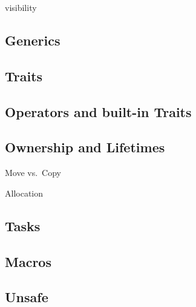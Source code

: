 \documentclass[]{article}
\begin{document}
visibility

\subsection{Generics}\label{generics}

\subsection{Traits}\label{traits}

\subsection{Operators and built-in
Traits}\label{operators-and-built-in-traits}

\subsection{Ownership and Lifetimes}\label{ownership-and-lifetimes}

Move vs.~Copy

Allocation

\subsection{Tasks}\label{tasks}

\subsection{Macros}\label{macros}

\subsection{Unsafe}\label{unsafe}
\end{document}
